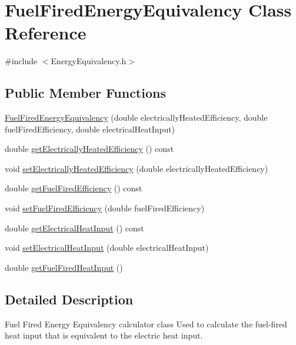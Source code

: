 \hypertarget{class_fuel_fired_energy_equivalency}{}\section{Fuel\+Fired\+Energy\+Equivalency Class Reference}
\label{class_fuel_fired_energy_equivalency}


{\ttfamily \#include $<$Energy\+Equivalency.\+h$>$}

\subsection*{Public Member Functions}
\begin{DoxyCompactItemize}
\item 
\hyperlink{class_fuel_fired_energy_equivalency_ac4ba992ccb3d4a19eb29f14898031690}{Fuel\+Fired\+Energy\+Equivalency} (double electrically\+Heated\+Efficiency, double fuel\+Fired\+Efficiency, double electrical\+Heat\+Input)
\item 
double \hyperlink{class_fuel_fired_energy_equivalency_ad4bd750677313895d8345c7eaf8308bd}{get\+Electrically\+Heated\+Efficiency} () const
\item 
void \hyperlink{class_fuel_fired_energy_equivalency_a2e8e166d9824ee07805cd790eff5e361}{set\+Electrically\+Heated\+Efficiency} (double electrically\+Heated\+Efficiency)
\item 
double \hyperlink{class_fuel_fired_energy_equivalency_ac8695c1fe3dcffeab60b5305239d2a58}{get\+Fuel\+Fired\+Efficiency} () const
\item 
void \hyperlink{class_fuel_fired_energy_equivalency_a510b4a7c1231faeeebca02fa0b1723ae}{set\+Fuel\+Fired\+Efficiency} (double fuel\+Fired\+Efficiency)
\item 
double \hyperlink{class_fuel_fired_energy_equivalency_a7d5878809c01a9243aa999406cddd4a9}{get\+Electrical\+Heat\+Input} () const
\item 
void \hyperlink{class_fuel_fired_energy_equivalency_a222836bfef1cb0caec0adafc2ef6b7ea}{set\+Electrical\+Heat\+Input} (double electrical\+Heat\+Input)
\item 
double \hyperlink{class_fuel_fired_energy_equivalency_a6bf68595ca361dd4135d0c84c2fbe6d9}{get\+Fuel\+Fired\+Heat\+Input} ()
\end{DoxyCompactItemize}


\subsection{Detailed Description}
Fuel Fired Energy Equivalency calculator class Used to calculate the fuel-\/fired heat input that is equivalent to the electric heat input. 

